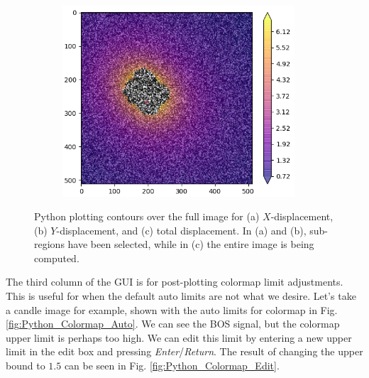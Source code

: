 \documentclass[letterpaper,12pt]{article}
\begin{document}
\begin{figure}[h]
\begin{subfigure}[b]{0.3\textwidth}
    \end{subfigure}
    \begin{subfigure}[b]{0.3\textwidth}
    	\centering
        \includegraphics[width=0.95\textwidth]{Python_Total_Overlay.PNG}
        \caption{}
        \label{fig:Python_Total_Overlay}
    \end{subfigure}
 	
    \caption{Python plotting contours over the full image for (a) $X$-displacement, (b) $Y$-displacement, and (c) total displacement.  In (a) and (b), sub-regions have been selected, while in (c) the entire image is being computed.}
    \label{fig:Python_Overlay}
\end{figure}

The third column of the GUI is for post-plotting colormap limit adjustments.  This is useful for when the default auto limits are not what we desire.  Let's take a candle image for example, shown with the auto limits for colormap in Fig. \ref{fig:Python_Colormap_Auto}.  We can see the BOS signal, but the colormap upper limit is perhaps too high.  We can edit this limit by entering a new upper limit in the edit box and pressing \textit{Enter}/\textit{Return}.  The result of changing the upper bound to $1.5$ can be seen in Fig. \ref{fig:Python_Colormap_Edit}.
\end{document}
